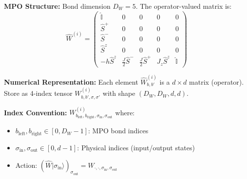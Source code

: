 \documentclass[aps,prb,onecolumn,scriptaddress]{revtex4-2}
\newcommand{\ket}[1]{|#1\rangle}
\newcommand{\Id}{\mathbb{I}}
\begin{document}
\textbf{MPO Structure:} Bond dimension $D_W = 5$. The operator-valued matrix is:
\begin{equation}
	\hat{W}^{(i)} = \begin{pmatrix}
		\hat{\Id} & 0 & 0 & 0 & 0 \\
		\hat{S}^+ & 0 & 0 & 0 & 0 \\
		\hat{S}^- & 0 & 0 & 0 & 0 \\
		\hat{S}^z & 0 & 0 & 0 & 0 \\
		-h\hat{S}^z & \frac{J}{2}\hat{S}^- & \frac{J}{2}\hat{S}^+ & J_z \hat{S}^z & \hat{\Id}
	\end{pmatrix}
\end{equation}

\textbf{Numerical Representation:} Each element $\hat{W}^{(i)}_{b,b'}$ is a $d \times d$ matrix (operator). Store as 4-index tensor $W^{(i)}_{b,b',\sigma,\sigma'}$ with shape $(D_W, D_W, d, d)$.

\textbf{Index Convention:} $W^{(i)}_{b_{\text{left}}, b_{\text{right}}, \sigma_{\text{in}}, \sigma_{\text{out}}}$ where:
\begin{itemize}
	\item $b_{\text{left}}, b_{\text{right}} \in [0, D_W-1]$: MPO bond indices
	\item $\sigma_{\text{in}}, \sigma_{\text{out}} \in [0, d-1]$: Physical indices (input/output states)
	\item Action: $(\hat{W}\ket{\sigma_{\text{in}}})_{\sigma_{\text{out}}} = W_{\cdot,\cdot,\sigma_{\text{in}},\sigma_{\text{out}}}$
\end{itemize}
\end{document}
